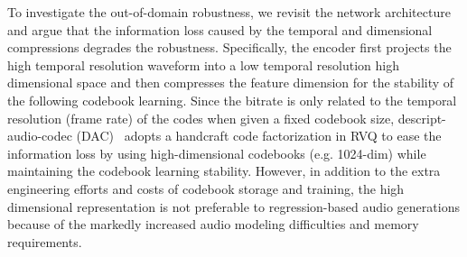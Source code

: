 To investigate the out-of-domain robustness, we revisit the network architecture and argue that the information loss caused by the temporal and dimensional compressions degrades the robustness. Specifically, the encoder first projects the high temporal resolution waveform into a low temporal resolution high dimensional space and then compresses the feature dimension for the stability of the following codebook learning. Since the bitrate is only related to the temporal resolution (frame rate) of the codes when given a fixed codebook size, descript-audio-codec (DAC)~\cite{dac} adopts a handcraft code factorization in RVQ to ease the information loss by using high-dimensional codebooks (e.g. 1024-dim) while maintaining the codebook learning stability. However, in addition to the extra engineering efforts and costs of codebook storage and training, the high dimensional representation is not preferable to regression-based audio generations because of the markedly increased audio modeling difficulties and memory requirements.

